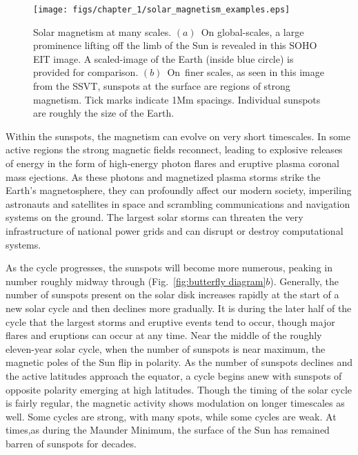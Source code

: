 \begin{figure}[!t]
  \begin{center}
    \texttt{[image: figs/chapter\_1/solar\_magnetism\_examples.eps]}
  \end{center}
  \caption[Solar magnetism at many scales]{Solar magnetism at many
    scales.  $(a)$~On global-scales, a large
    prominence lifting off the limb of the Sun is 
    revealed in this SOHO EIT image.  A scaled-image of the Earth
    (inside blue circle) is provided for comparison. 
    $(b)$~On~finer scales, as seen in this image from the SSVT,
    sunspots at the surface are regions of
    strong magnetism.  Tick marks indicate 1Mm spacings.  Individual
    sunspots are roughly the size of the Earth.
    \label{fig:solar magnetism}}
\end{figure}

Within the sunspots, the magnetism can evolve on very short
timescales.  In some active regions the strong magnetic fields reconnect, leading to
explosive releases of energy in the form of high-energy photon flares 
and eruptive plasma coronal mass ejections.  As these photons and
magnetized plasma storms strike the Earth's magnetosphere, they can
profoundly affect our modern society, imperiling astronauts and
satellites in space and scrambling communications and navigation
systems on the ground.  The largest solar storms can threaten the 
very infrastructure of national power grids and can disrupt or
destroy computational systems.   

As the cycle progresses, the sunspots will become more numerous, peaking in
number roughly midway through (Fig.~\ref{fig:butterfly diagram}$b$).
Generally, the number of sunspots present on the solar disk increases
rapidly at the start of a new solar cycle and then declines more gradually.
It is during the later half of the 
cycle that the largest storms and eruptive events tend to occur,
though major flares and eruptions can occur at any time.  
Near the middle of the roughly eleven-year solar cycle, when the
number of sunspots is near maximum, the magnetic poles of the Sun flip in polarity.  As the number of sunspots
declines and the active latitudes approach the equator, a cycle begins
anew with sunspots of opposite polarity emerging at high latitudes.   
Though the timing of the solar cycle is fairly regular, the
magnetic activity shows modulation on longer timescales as well. Some
cycles are strong, with many spots, while some cycles are weak. At
times,as during the Maunder Minimum, the surface of the Sun has
remained barren of sunspots for decades. 



